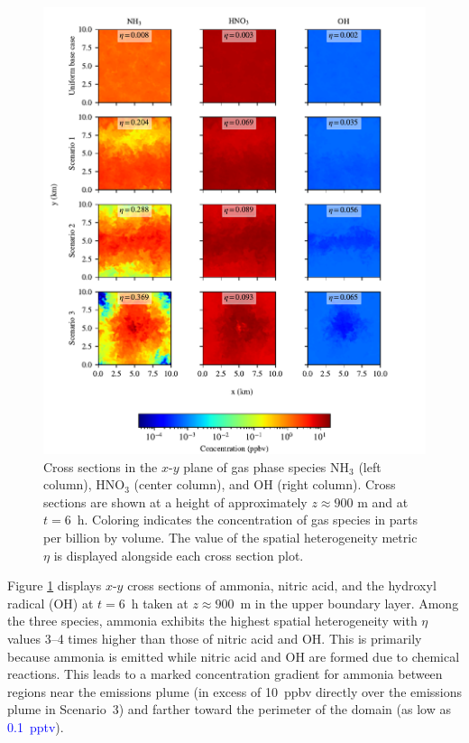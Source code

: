 \documentclass[journal abbreviation, manuscript]{copernicus}
\begin{document}
\begin{figure}[!h]
	\centering
	\includegraphics[]{figures/gas-spatial-heterogeneity-time36-z45.pdf}
	\caption{Cross sections in the $x$-$y$ plane of gas phase
          species NH$_3$ (left column), HNO$_3$ (center column), and
          OH (right column). Cross sections are shown at a height of
          approximately $z\approx900$ m and at $t=6$~h. Coloring
          indicates the concentration of gas species in parts per
          billion by volume. The value of the spatial heterogeneity
          metric $\eta$ is displayed alongside each cross section
          plot.}
	\label{fig:gas-cross-sec}
\end{figure} 

Figure \ref{fig:gas-cross-sec} displays $x$-$y$ cross sections of
ammonia, nitric acid, and the hydroxyl radical (OH) at $t=6$~h taken
at $z\approx900$~m in the upper boundary layer. Among the three
species, ammonia exhibits the highest spatial heterogeneity with
$\eta$ values 3--4 times higher than those of nitric acid and OH. This
is primarily because ammonia is emitted while nitric acid and OH are
formed due to chemical reactions. This leads to a marked concentration
gradient for ammonia between regions near the emissions plume (in
excess of 10~ppbv directly over the emissions plume in Scenario~3) and
farther toward the perimeter of the domain (as low as \textcolor{blue}{0.1~pptv}).
\end{document}
